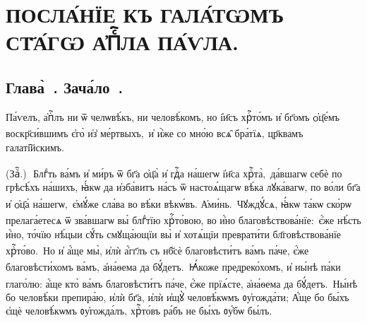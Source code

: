 ﻿
\section[Посла́нїе къ гала́тѡмъ ст҃а́гѡ а҆пⷭ҇ла па́ѵла.]{ПОСЛА́НЇЕ КЪ ГАЛА́ТѠМЪ\\СТ҃А́ГѠ А҆Пⷭ҇ЛА ПА́ѴЛА.}

\subsection{Глава̀~. Зача́ло~.}

\cuLettrine Па́ѵелъ, а҆пⷭ҇лъ ни ѿ челѡвѣ́къ, ни человѣ́комъ, но і҆и҃съ хрⷭ҇то́мъ и҆ бг҃омъ ѻ҆ц҃е́мъ воскр҃си́вшимъ є҆го̀ и҆з̾ ме́ртвыхъ, \textsuperscript{}\,и҆ и҆̀же со мно́ю всѧ̑ бра́тїѧ, цр҃квамъ галаті̑йскимъ.

(Заⷱ҇\:.)~\textsuperscript{}\,Блгⷣть ва́мъ и҆ ми́ръ ѿ бг҃а ѻ҆ц҃а̀ и҆ гдⷭ҇а на́шегѡ і҆и҃са хрⷭ҇та̀, \textsuperscript{}\,да́вшагѡ себѐ по грѣсѣ́хъ на́шихъ, ꙗ҆́кѡ да и҆зба́витъ на́съ ѿ настоѧ́щагѡ вѣ́ка лꙋка́вагѡ, по во́ли бг҃а и҆ ѻ҆ц҃а̀ на́шегѡ, \textsuperscript{}\,є҆мꙋ́же сла́ва во вѣ́ки вѣкѡ́въ. А҆ми́нь. \textsuperscript{}\,Чꙋждꙋ́сѧ, ꙗ҆́кѡ та́кѡ ско́рѡ прелага́етесѧ ѿ зва́вшагѡ вы̀ блгⷣтїю хрⷭ҇то́вою, во и҆́но благовѣствова́нїе: \textsuperscript{}\,є҆́же нѣ́сть и҆́но, то́чїю нѣ́цыи сꙋ́ть смꙋща́ющїи вы̀ и҆ хотѧ́щїи преврати́ти бл҃говѣствова́нїе хрⷭ҇то́во. \textsuperscript{}\,Но и҆ а҆́ще мы̀, и҆лѝ а҆́гг҃лъ съ нб҃сѐ благовѣсти́тъ ва́мъ па́че, є҆́же благовѣсти́хомъ ва́мъ, а҆на́ѳема да бꙋ́детъ. \textsuperscript{}\,Ꙗ҆́коже предреко́хомъ, и҆ ны́нѣ па́ки глаго́лю: а҆́ще кто̀ ва́мъ благовѣсти́тъ па́че, є҆́же прїѧ́сте, а҆на́ѳема да бꙋ́детъ. \textsuperscript{}\,Ны́нѣ бо человѣ́ки препира́ю, и҆лѝ бг҃а, и҆лѝ и҆щꙋ̀ человѣ́кѡмъ ᲂу҆гожда́ти; А҆́ще бо бы́хъ є҆щѐ человѣ́кѡмъ ᲂу҆гожда́лъ, хрⷭ҇то́въ ра́бъ не бы́хъ ᲂу҆́бѡ бы́лъ.

